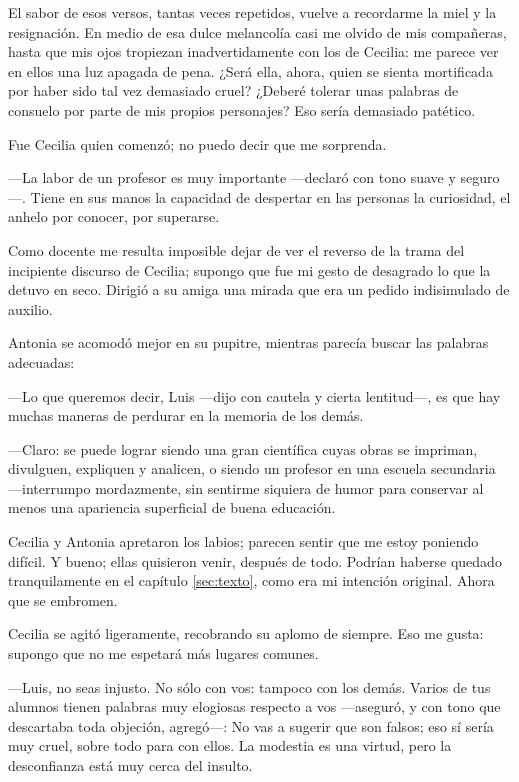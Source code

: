 \vspace{1em}

\vspace{1em}

El sabor de esos versos, tantas veces repetidos, vuelve a recordarme
la miel y la resignación. En medio de esa dulce melancolía casi me
olvido de mis compañeras, hasta que mis ojos tropiezan
inadvertidamente con los de Cecilia: me parece ver en ellos una luz
apagada de pena. ¿Será ella, ahora, quien se sienta mortificada por
haber sido tal vez demasiado cruel? ¿Deberé tolerar unas palabras de
consuelo por parte de mis propios personajes?  Eso sería demasiado
patético.

Fue Cecilia quien comenzó; no puedo decir que me sorprenda.

---La labor de un profesor es muy importante ---declaró con tono suave
y seguro---. Tiene en sus manos la capacidad de despertar en las
personas la curiosidad, el anhelo por conocer, por superarse.

Como docente me resulta imposible dejar de ver el reverso de la trama
del incipiente discurso de Cecilia; supongo que fue mi gesto de
desagrado lo que la detuvo en seco. Dirigió a su amiga una mirada que
era un pedido indisimulado de auxilio.

Antonia se acomodó mejor en su pupitre, mientras parecía buscar las
palabras adecuadas:

---Lo que queremos decir, Luis ---dijo con cautela y cierta
len\-ti\-tud---, es que hay muchas maneras de perdurar en la memoria
de los demás.

---Claro: se puede lograr siendo una gran científica cuyas obras se
impriman, divulguen, expliquen y analicen, o siendo un profesor en una
escuela secundaria ---interrumpo mordazmente, sin sentirme siquiera de
humor para conservar al menos una apariencia superficial de buena
educación.

Cecilia y Antonia apretaron los labios; parecen sentir que me estoy
poniendo difícil. Y bueno; ellas quisieron venir, después de
todo. Podrían haberse quedado tranquilamente en el capítulo
\ref{sec:texto}, como era mi intención original. Ahora que se
embromen.

Cecilia se agitó ligeramente, recobrando su aplomo de siempre. Eso me
gusta: supongo que no me espetará más lugares comunes.

---Luis, no seas injusto. No sólo con vos: tampoco con los
demás. Varios de tus alumnos tienen palabras muy elogiosas respecto a
vos ---aseguró, y con tono que descartaba toda objeción, agregó---: No
vas a sugerir que son falsos; eso sí sería muy cruel, sobre todo para
con ellos. La modestia es una virtud, pero la desconfianza está muy
cerca del insulto.

